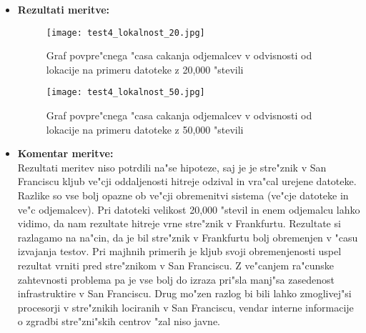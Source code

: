 \begin{itemize}
 	\item \textbf{Rezultati meritve: }  \\
		\begin{figure}[h]
  		\centering
  		  \texttt{[image: test4\_lokalnost\_20.jpg]}
  		\caption{Graf povpre"cnega "casa cakanja odjemalcev v odvisnosti od lokacije na primeru datoteke z 20,000 "stevili}
  		\label{8_graf_lokalnost_20}
		\end{figure}
		\begin{figure}[h]
  		\centering
  		  \texttt{[image: test4\_lokalnost\_50.jpg]}
  		\caption{Graf povpre"cnega "casa cakanja odjemalcev v odvisnosti od lokacije na primeru datoteke z 50,000 "stevili}
  		\label{8_graf_lokalnost_50}
		\end{figure}
	\pagebreak
	\item \textbf{Komentar meritve: } \\ 
		Rezultati meritev niso potrdili na"se hipoteze, saj je je stre"znik v San Franciscu kljub ve"cji oddaljenosti hitreje odzival in vra"cal urejene datoteke. 
		Razlike so vse bolj opazne ob ve"cji obremenitvi sistema (ve"cje datoteke in ve"c odjemalcev). Pri datoteki velikost 20,000 "stevil in enem odjemalcu lahko vidimo, da nam rezultate hitreje vrne stre"znik v Frankfurtu. Rezultate si razlagamo na na"cin, da je bil stre"znik v Frankfurtu bolj obremenjen v "casu izvajanja testov. Pri majhnih primerih je kljub svoji obremenjenosti uspel rezultat vrniti pred stre"znikom v San Franciscu. Z ve"canjem ra"cunske zahtevnosti problema pa je vse bolj do izraza pri"sla manj"sa zasedenost infrastruktire v San Franciscu. Drug mo"zen razlog bi bili lahko zmoglivej"si procesorji v stre"znikih lociranih v San Franciscu, vendar interne informacije o zgradbi stre"zni"skih centrov "zal niso javne.


\end{itemize}

